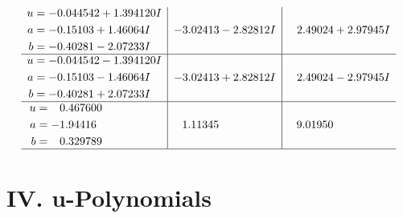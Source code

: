 \documentclass[1p]{elsarticle_modified}
\theoremstyle{definition}
\begin{document}
$$\begin{array}{c|c|c}
\begin{aligned}
u &= -0.044542 + 1.394120 I \\
a &= -0.15103 + 1.46064 I \\
b &= -0.40281 - 2.07233 I\end{aligned}
 & -3.02413 - 2.82812 I & \phantom{-}2.49024 + 2.97945 I \\ \hline\begin{aligned}
u &= -0.044542 - 1.394120 I \\
a &= -0.15103 - 1.46064 I \\
b &= -0.40281 + 2.07233 I\end{aligned}
 & -3.02413 + 2.82812 I & \phantom{-}2.49024 - 2.97945 I \\ \hline\begin{aligned}
u &= \phantom{-}0.467600\phantom{ +0.000000I} \\
a &= -1.94416\phantom{ +0.000000I} \\
b &= \phantom{-}0.329789\phantom{ +0.000000I}\end{aligned}
 & \phantom{-}1.11345\phantom{ +0.000000I} & \phantom{-}9.01950\phantom{ +0.000000I}\\
 \hline 
 \end{array}$$\newpage
\newpage\renewcommand{\arraystretch}{1}
\centering \section*{ IV. u-Polynomials}
\end{document}
